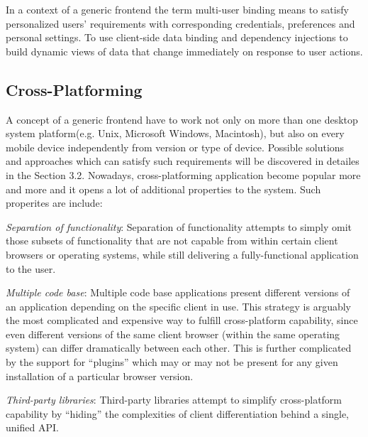 	In a context of a generic frontend the term multi-user binding means to satisfy personalized users' requirements with corresponding credentials, preferences and personal settings. To use client-side data binding and dependency injections to build dynamic views of data that change immediately on response to user actions.

\subsection {Cross-Platforming}
    A concept of a generic frontend have to work not only on more than one desktop system platform(e.g. Unix, Microsoft Windows, Macintosh), but also on every mobile device independently from version or type of device. Possible solutions and approaches which can satisfy such requirements will be discovered in detailes in the Section 3.2. Nowadays, cross-platforming application become popular more and more and it opens a lot of additional properties to the system. Such properites are include:

	\emph{Separation of functionality}:	Separation of functionality attempts to simply omit those subsets of functionality that are not capable from within certain client browsers or operating systems, while still delivering a fully-functional application to the user.

	\emph{Multiple code base}: Multiple code base applications present different versions of an application depending on the specific client in use. This strategy is arguably the most complicated and expensive way to fulfill cross-platform capability, since even different versions of the same client browser (within the same operating system) can differ dramatically between each other. This is further complicated by the support for ``plugins'' which may or may not be present for any given installation of a particular browser version.

	\emph{Third-party libraries}: Third-party libraries attempt to simplify cross-platform capability by ``hiding'' the complexities of client differentiation behind a single, unified API.

